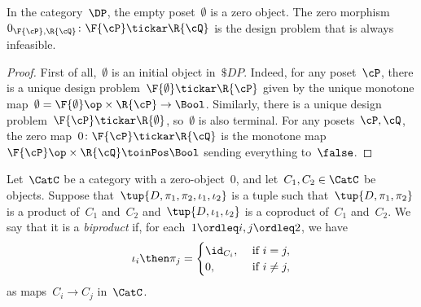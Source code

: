 \begin{lemma}
In the category~$\DP$, the empty poset~$\emptyset$ is a zero object. The zero morphism~$0_{\F{\cP},\R{\cQ}}\colon \F{\cP} \tickar \R{\cQ}$ is the design problem that is always infeasible.
\end{lemma}
\begin{proof}
    First of all,~$\emptyset$ is an initial object in~$\$DP$. Indeed, for any poset~$\cP $, there is a unique design problem~$\F{\emptyset} \tickar \R{\cP}$ given by the unique monotone map~$\emptyset=\F{\emptyset}\op\times \R{\cP} \to\Bool$. Similarly, there is a unique design problem~$\F{\cP} \tickar \R{\emptyset}$, so~$\emptyset$ is also terminal. For any posets~$\cP ,\cQ$, the zero map~$0 \colon \F{\cP} \tickar \R{\cQ}$ is the monotone map~$\F{\cP} \op\times \R{\cQ} \toinPos \Bool$ sending everything to~$\false$.
\end{proof}

\begin{shaded}
\begin{definition}[Biproduct]
Let~$\CatC$ be a category with a zero-object~$0$, and let~$C_1,C_2\in\CatC$ be objects. Suppose that~$\tup{D,\pi_1,\pi_2,\iota_1,\iota_2}$ is a tuple such that~$\tup{D,\pi_1,\pi_2}$ is a product of~$C_1$ and~$C_2$ and~$\tup{D,\iota_1,\iota_2}$ is a coproduct of~$C_1$ and~$C_2$. We say that it is a \emph{biproduct} if, for each~$1\ordleq i,j\ordleq 2$, we have
\begin{equation}
\iota_i\then \pi_j=
\begin{cases}
	\id_{C_i}, &\text{ if }i=j,\\
	0, &\text{ if }i\neq j,
\end{cases} \label{eq:biproduct-condition}
\end{equation}
as maps~$C_i\to C_j$ in~$\CatC$.
\end{definition}
\end{shaded}

